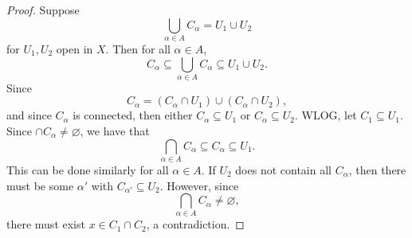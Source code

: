 \begin{proof}
	Suppose
	\[
		\bigcup_{\alpha \in A} C_\alpha =U_1 \cup U_2
	\]
	for $U_1,U_2$ open in $X$. Then for all $\alpha \in A$,
	\[
		C_\alpha \subseteq \bigcup_{\alpha \in A} C_\alpha \subseteq U_1 \cup U_2
	.\]
	Since
	\[
		C_\alpha =\left( C_\alpha \cap U_1 \right) \cup \left( C_\alpha \cap U_2 \right) 
	,\]
	and since $C_\alpha $ is connected, then either $C_\alpha \subseteq U_1$ or $C_\alpha \subseteq U_2$. WLOG, let $C_1 \subseteq U_1$. Since $\cap C_\alpha \neq \varnothing $, we have that
	\[
		\bigcap_{\alpha \in A} C_\alpha \subseteq C_\alpha \subseteq U_1
	.\]
	This can be done similarly for all $\alpha \in A$. If $U_2$ does not contain all $C_\alpha $, then there must be some $\alpha '$ with $C_{\alpha '} \subseteq  U_2$. However, since
	\[
		\bigcap_{\alpha \in A} C_\alpha \neq \varnothing 
	,\]
	there must exist $x\in C_1 \cap C_2$, a contradiction.
\end{proof}


